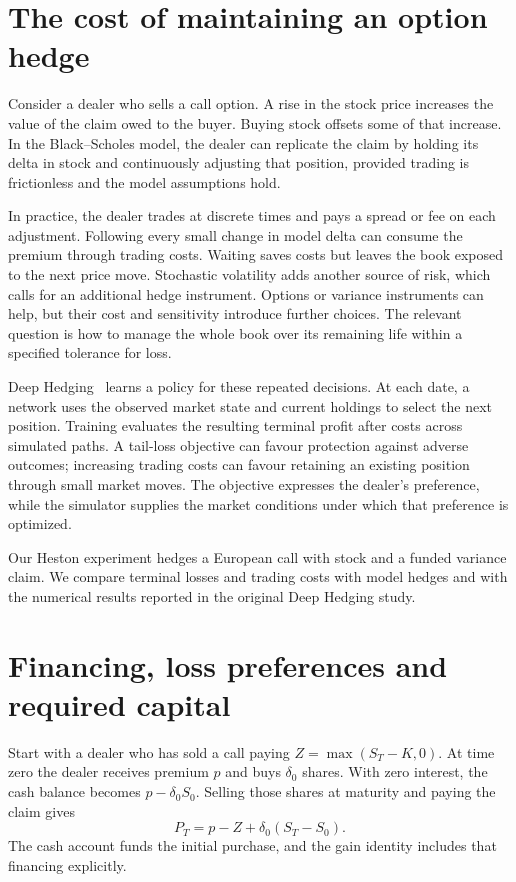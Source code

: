 \documentclass[8pt]{strategynet-journal}
\begin{document}
\begin{SNcolumns}
\section{The cost of maintaining an option hedge}
Consider a dealer who sells a call option. A rise in the stock price increases
the value of the claim owed to the buyer. Buying stock offsets some of that
increase. In the Black--Scholes model, the dealer can replicate the claim by
holding its delta in stock and continuously adjusting that position, provided
trading is frictionless and the model assumptions hold.

In practice, the dealer trades at discrete times and pays a spread or fee on
each adjustment. Following every small change in model delta can consume the
premium through trading costs. Waiting saves costs but leaves the book exposed
to the next price move. Stochastic volatility adds another source of risk,
which calls for an additional hedge instrument. Options or variance instruments can
help, but their cost and sensitivity introduce further choices. The relevant
question is how to manage the whole book over its remaining life within a
specified tolerance for loss.

Deep Hedging~\cite{deephedging} learns a policy for these repeated decisions.
At each date, a network uses the observed market state and current holdings
to select the next position. Training evaluates the resulting terminal profit
after costs across simulated paths. A tail-loss objective can favour protection
against adverse outcomes; increasing trading costs can favour retaining an
existing position through small market moves. The objective expresses the
dealer's preference, while the simulator supplies the market conditions under
which that preference is optimized.

Our Heston experiment hedges a European call with stock and a funded variance
claim. We compare terminal losses and trading costs with model hedges and with
the numerical results reported in the original Deep Hedging study.

\section{Financing, loss preferences and required capital}
Start with a dealer who has sold a call paying $Z=\max(S_T-K,0)$.
At time zero the dealer receives premium
$p$ and buys $\delta_0$ shares. With zero interest, the cash balance becomes
$p-\delta_0S_0$. Selling those shares at maturity and paying the claim gives
\[
 P_T=p-Z+\delta_0(S_T-S_0).
\]
The cash account funds the initial purchase, and the gain identity includes
that financing explicitly.


\end{SNcolumns}
\end{document}
